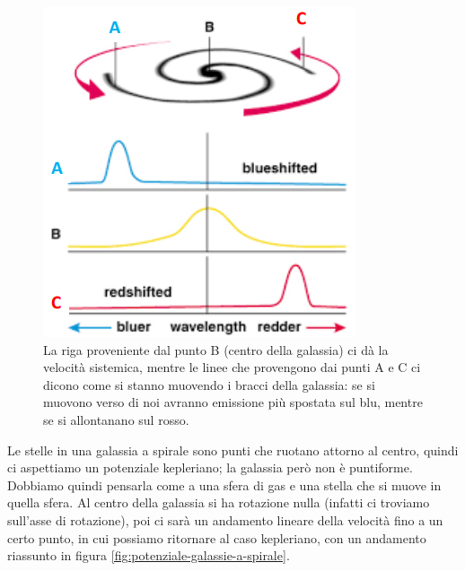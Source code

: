 \begin{figure}
    \centering
    \includegraphics[width = 0.4 \textwidth]{immagini/effetto-doppler.png}
    \caption{La riga proveniente dal punto B (centro della galassia) ci dà la velocità sistemica, mentre le linee che provengono dai punti A e C ci dicono come si stanno muovendo i bracci della galassia: se si muovono verso di noi avranno emissione più spostata sul blu, mentre se si allontanano sul rosso.}
    \label{fig:effetto-doppler-galassie}
\end{figure}

Le stelle in una galassia a spirale sono punti che ruotano attorno al centro, quindi  ci aspettiamo un potenziale kepleriano; la galassia però non è puntiforme. Dobbiamo quindi pensarla come a una sfera di gas e una stella che si muove in quella sfera. Al centro della galassia si ha rotazione nulla (infatti ci troviamo sull'asse di rotazione), poi ci sarà un andamento lineare della velocità fino a un certo punto, in cui possiamo ritornare al caso kepleriano, con un andamento riassunto in figura \ref{fig:potenziale-galassie-a-spirale}. 

